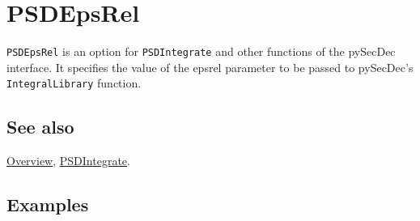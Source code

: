 \documentclass[../FeynHelpersManual.tex]{subfiles}
\begin{document}
\hypertarget{psdepsrel}{
\section{PSDEpsRel}\label{psdepsrel}}

\texttt{PSDEpsRel} is an option for \texttt{PSDIntegrate} and other
functions of the pySecDec interface. It specifies the value of the
epsrel parameter to be passed to pySecDec's \texttt{IntegralLibrary}
function.

\subsection{See also}

\hyperlink{toc}{Overview}, \hyperlink{psdintegrate}{PSDIntegrate}.

\subsection{Examples}
\end{document}
